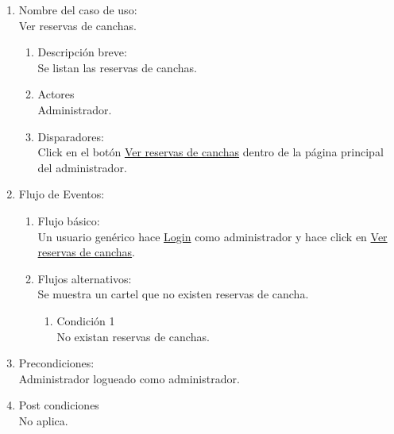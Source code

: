 \documentclass[a4paper,11pt]{article}
\begin{document}
\begin{enumerate}

    \item Nombre del caso de uso: \\
    Ver reservas de canchas.

    \begin{enumerate}
    \item Descripción breve: \\
        Se listan las reservas de canchas.
    \item Actores \\
        Administrador.
    \item Disparadores: \\
        Click en el botón \underline{Ver reservas de canchas} dentro de la
        página principal del administrador.
    \end{enumerate}

    \item Flujo de Eventos: \\

    \begin{enumerate}

        \item Flujo básico:\\
            Un usuario genérico hace \underline{Login} como administrador y
            hace click en \underline{Ver reservas de canchas}.
        \item Flujos alternativos:\\
            Se muestra un cartel que no existen reservas de cancha.
            \begin{enumerate}
                \item Condición 1 \\
                    No existan reservas de canchas.
            \end{enumerate}

    \end{enumerate}

    \item Precondiciones: \\
        Administrador logueado como administrador.

    \item Post condiciones \\
        No aplica.

\end{enumerate}
\end{document}

